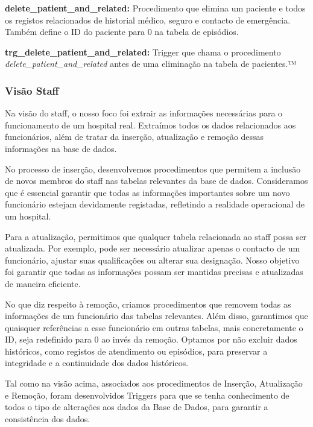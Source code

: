 \vspace{0.15cm}
\textbf{delete\_patient\_and\_related:} Procedimento que elimina um paciente e todos os registos relacionados de historial médico, seguro e contacto de emergência. Também define o ID do paciente para 0 na tabela de episódios.

\vspace{0.15cm}
\textbf{trg\_delete\_patient\_and\_related:} Trigger que chama o procedimento \textit{delete\_patient\_and\_related} antes de uma eliminação na tabela de pacientes.™

\subsubsection{Visão Staff}

Na visão do staff, o nosso foco foi extrair as informações necessárias para o funcionamento de um hospital real. Extraímos todos os dados relacionados aos funcionários, além de tratar da inserção, atualização e remoção dessas informações na base de dados.

No processo de inserção, desenvolvemos procedimentos que permitem a inclusão de novos membros do staff nas tabelas relevantes da base de dados. Consideramos que é essencial garantir que todas as informações importantes sobre um novo funcionário estejam devidamente registadas, refletindo a realidade operacional de um hospital.

Para a atualização, permitimos que qualquer tabela relacionada ao staff possa ser atualizada. Por exemplo, pode ser necessário atualizar apenas o contacto de um funcionário, ajustar suas qualificações ou alterar sua designação. Nosso objetivo foi garantir que todas as informações possam ser mantidas precisas e atualizadas de maneira eficiente.

No que diz respeito à remoção, criamos procedimentos que removem todas as informações de um funcionário das tabelas relevantes. Além disso, garantimos que quaisquer referências a esse funcionário em outras tabelas, mais concretamente o ID, seja redefinido para 0 ao invés da remoção. Optamos por não excluir dados históricos, como registos de atendimento ou episódios, para preservar a integridade e a continuidade dos dados históricos.

Tal como na visão acima, associados aos procedimentos de Inserção, Atualização e Remoção, foram desenvolvidos Triggers para que se tenha conhecimento de todos o tipo de alterações aos dados da Base de Dados, para garantir a consistência dos dados.

